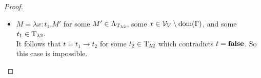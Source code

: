 \begin{proof}
\begin{itemize}
		\begin{figure}[H]
			\centering
			
		\end{figure}
		
		For $i\in\{1,\dots,n-1\}$ we can apply Lemma \ref{l2h} to $\trans{\Gamma}\lambdaModels N_i:\code{P^i}{\predTFst[i]}{\predTSnd[i]}$ to get that $\predTFst[i],\predTSnd[i]\in\VarP$ and that $\Gamma\PModels P^i(\predTFst[i],\predTSnd[i])$.
		Now we take a closer look at $L$. First note that because either $\predFst[n]=\beta$ or there exits an $i\in\{1,\dots,n-1\}$ such that $\predFst[n]\in\FV(P^i(\predFst[i],\predSnd[i]))$ which implies that $\predTFst[n]=\predTFst[i]$ or $\predTFst[n]=\predTSnd[i]$. In both cases we get that $\predTFst[n]\in\VarP$. A similar argument yields $\predTSnd[n]\in\VarP$.
		
		$L=y$,\hspace{2cm}$A'\in\Gamma$ trivial
		
		$L=\Lambda\beta.y$,\hspace{2cm}$A'\in\Gamma$ trivial
		
		$L=\Lambda\beta.y\vec{t'}\vec{N'}$,\hspace{2cm}as in previous proof
		
		$L=\Lambda\beta.\lambda y:\code{P^n}{\predTFst[n]}{\predTSnd[n]}.N$,\hspace{2cm} $\trans{\Gamma},y:\code{P^n}{\predTFst[n]}{\predTSnd[n]}\lambdaModels N:\false$ by IH
		
		$L=\Lambda\beta.M'\,t'$, $M'=yt_1\dots t_l$,\hspace{2cm}$A'\in\Gamma$ trivial
		
		$L=M'\,t'$, $M'=yt_1\dots t_l$,\hspace{2cm}$A'\in\Gamma$ trivial
		
		implies $\Gamma\PModels\forall\beta(P^n(\predTFst[n],\predTSnd[n])\to\false)$. Now we can show that \false{} is a semantic consequence of $\Gamma$.
		
		\begin{figure}[H]
			\centering
			
		\end{figure}
		
	\item[] \underline{$M=\lambda x:t_1.M'$} for some $M'\in\Lambda_{\text{T}_{\lambda2}}$, some $x\in\mathcal{V}_V\setminus\text{dom}(\Gamma)$, and some $t_1\in\text{T}_{\lambda2}$.\\
		It follows that $t=t_1\to t_2$ for some $t_2\in\text{T}_{\lambda2}$ which contradicts $t=\textbf{false}$. So this case is impossible.


\end{itemize}
\end{proof}
